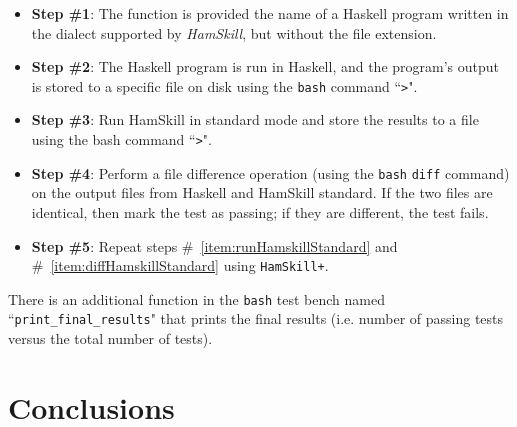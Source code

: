 \documentclass{report}
\begin{document}
\begin{itemize}

\item \textbf{Step \#1}: The function is provided the name of a Haskell program written in the dialect supported by \textit{HamSkill}, but without the file extension.

\item \textbf{Step \#2}: The Haskell program is run in Haskell, and the program's output is stored to a specific file on disk using the \texttt{bash} command ``\texttt{>}". 

\item\label{item:runHamskillStandard} \textbf{Step \#3}: Run HamSkill in standard mode and store the results to a file using the bash command ``\texttt{>}". 

\item\label{item:diffHamskillStandard} \textbf{Step \#4}: Perform a file difference operation (using the \texttt{bash} \texttt{diff} command) on the output files from Haskell and HamSkill standard.  If the two files are identical, then mark the test as passing; if they are different, the test fails.
 
\item \textbf{Step \#5}: Repeat steps \#~\ref{item:runHamskillStandard} and \#~\ref{item:diffHamskillStandard} using \texttt{HamSkill+}.

\end{itemize}

There is an additional function in the \texttt{bash} test bench named ``\texttt{print\_final\_results}" that prints the final results (i.e. number of passing tests versus the total number of tests).

\section{Conclusions}



\pagebreak


\end{document}
